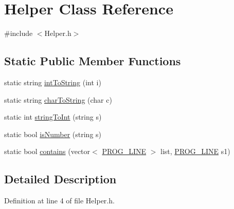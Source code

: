 \hypertarget{class_helper}{\section{Helper Class Reference}
\label{class_helper}
}


{\ttfamily \#include $<$Helper.\-h$>$}

\subsection*{Static Public Member Functions}
\begin{DoxyCompactItemize}
\item 
static string \hyperlink{class_helper_a85c37e6dcc54697849c236a0d8199295}{int\-To\-String} (int i)
\item 
static string \hyperlink{class_helper_a499fbc5539805320c20bfde4e05a1575}{char\-To\-String} (char c)
\item 
static int \hyperlink{class_helper_a194a08a1b9cb31ed7d156f678c688aad}{string\-To\-Int} (string s)
\item 
static bool \hyperlink{class_helper_a29cdec2e31bf868c4c4fc454251d9441}{is\-Number} (string s)
\item 
static bool \hyperlink{class_helper_a70ce5e30e79deea6da0d85ddc3b3b771}{contains} (vector$<$ \hyperlink{std_afx_8h_abcc2d0120d16c2587a85b314010f6399}{P\-R\-O\-G\-\_\-\-L\-I\-N\-E} $>$ list, \hyperlink{std_afx_8h_abcc2d0120d16c2587a85b314010f6399}{P\-R\-O\-G\-\_\-\-L\-I\-N\-E} s1)
\end{DoxyCompactItemize}


\subsection{Detailed Description}


Definition at line 4 of file Helper.\-h.



